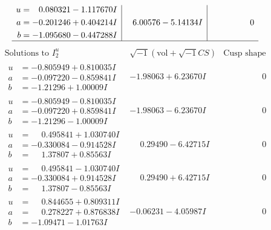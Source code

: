 \documentclass[1p]{elsarticle_modified}
\theoremstyle{definition}
\newcommand{\I}{\sqrt{-1}}
\begin{document}
$$\begin{array}{c|c|c}
\begin{aligned}
u &= \phantom{-}0.080321 - 1.117670 I \\
a &= -0.201246 + 0.404214 I \\
b &= -1.095680 - 0.447288 I\end{aligned}
 & \phantom{-}6.00576 - 5.14134 I & \phantom{-0.000000 } 0\\
 \hline 
 \end{array}$$\newpage$$\begin{array}{c|c|c}  
\text{Solutions to }I^u_{2}& \I (\text{vol} + \sqrt{-1}CS) & \text{Cusp shape}\\
 \hline 
\begin{aligned}
u &= -0.805949 + 0.810035 I \\
a &= -0.097220 - 0.859841 I \\
b &= -1.21296 + 1.00009 I\end{aligned}
 & -1.98063 + 6.23670 I & \phantom{-0.000000 } 0 \\ \hline\begin{aligned}
u &= -0.805949 - 0.810035 I \\
a &= -0.097220 + 0.859841 I \\
b &= -1.21296 - 1.00009 I\end{aligned}
 & -1.98063 - 6.23670 I & \phantom{-0.000000 } 0 \\ \hline\begin{aligned}
u &= \phantom{-}0.495841 + 1.030740 I \\
a &= -0.330084 - 0.914528 I \\
b &= \phantom{-}1.37807 + 0.85563 I\end{aligned}
 & \phantom{-}0.29490 - 6.42715 I & \phantom{-0.000000 } 0 \\ \hline\begin{aligned}
u &= \phantom{-}0.495841 - 1.030740 I \\
a &= -0.330084 + 0.914528 I \\
b &= \phantom{-}1.37807 - 0.85563 I\end{aligned}
 & \phantom{-}0.29490 + 6.42715 I & \phantom{-0.000000 } 0 \\ \hline\begin{aligned}
u &= \phantom{-}0.844655 + 0.809311 I \\
a &= \phantom{-}0.278227 + 0.876838 I \\
b &= -1.09471 - 1.01763 I\end{aligned}
 & -0.06231 - 4.05987 I & \phantom{-0.000000 } 0 \\ \hline\begin{aligned}

\end{aligned}
\end{array}$$
\end{document}
